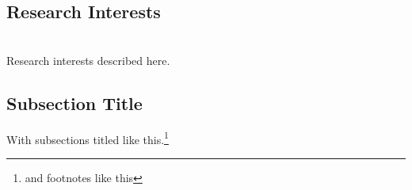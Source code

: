 \begin{spacing}{1.2}
\section{Research Interests}\\
Research interests described here.\\

\subsection{Subsection Title}
With subsections titled like this.\footnote{and footnotes like this}

\end{spacing}
